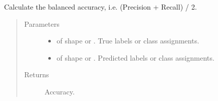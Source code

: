 \documentclass[letterpaper,10pt,english]{sphinxmanual}
\begin{document}
\begin{fulllineitems}
\label{\detokenize{pusion.evaluation.evaluation_metrics:pusion.evaluation.evaluation_metrics.balanced_multiclass_accuracy}}
\sphinxAtStartPar
Calculate the balanced accuracy, i.e. (Precision + Recall) / 2.
\begin{quote}\begin{description}
\item[{Parameters}] \leavevmode\begin{itemize}
\item {} 
\sphinxAtStartPar
{} \textendash{}  of shape  or . True labels or class assignments.

\item {} 
\sphinxAtStartPar
{} \textendash{}  of shape  or . Predicted labels or
class assignments.

\end{itemize}

\item[{Returns}] \leavevmode
\sphinxAtStartPar
Accuracy.

\end{description}\end{quote}

\end{fulllineitems}

\end{document}
